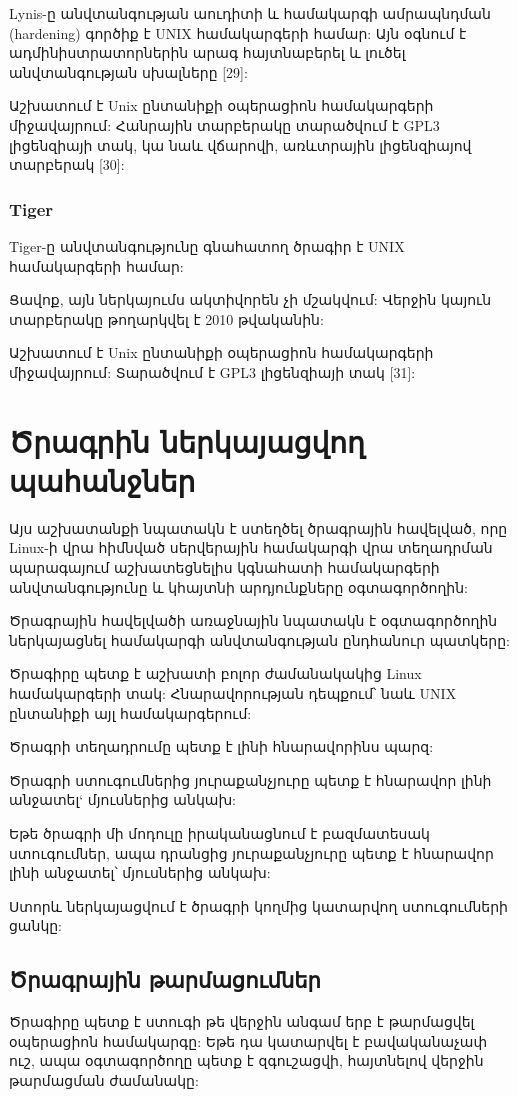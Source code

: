 \documentclass[a4paper,12pt]{article}
\begin{document}
\begin{sloppypar}
Lynis-ը անվտանգության աուդիտի և համակարգի ամրապնդման (hardening)
գործիք է UNIX համակարգերի համար:
Այն օգնում է ադմինիստրատորներին արագ հայտնաբերել և լուծել
անվտանգության սխալները [29]:

Աշխատում է Unix ընտանիքի օպերացիոն համակարգերի միջավայրում:
Հանրային տարբերակը տարածվում է GPL3 լիցենզիայի տակ, կա նաև վճարովի,
առևտրային լիցենզիայով տարբերակ [30]:


\subsubsection{Tiger}


Tiger-ը անվտանգությունը գնահատող ծրագիր է UNIX համակարգերի համար:

Ցավոք, այն ներկայումս ակտիվորեն չի մշակվում: Վերջին կայուն տարբերակը
թողարկվել է 2010 թվականին:

Աշխատում է Unix ընտանիքի օպերացիոն համակարգերի միջավայրում:
Տարածվում է GPL3 լիցենզիայի տակ [31]:


\section{Ծրագրին ներկայացվող պահանջներ}


Այս աշխատանքի նպատակն է ստեղծել ծրագրային հավելված, որը Linux-ի
վրա հիմնված սերվերային համակարգի վրա տեղադրման պարագայում
աշխատեցնելիս կգնահատի համակարգերի անվտանգությունը և կհայտնի
արդյունքները օգտագործողին:

Ծրագրային հավելվածի առաջնային նպատակն է օգտագործողին ներկայացնել
համակարգի անվտանգության ընդհանուր պատկերը:

Ծրագիրը պետք է աշխատի բոլոր ժամանակակից Linux համակարգերի տակ:
Հնարավորության դեպքում՝ նաև UNIX ընտանիքի այլ համակարգերում:

Ծրագրի տեղադրումը պետք է լինի հնարավորինս պարզ:

Ծրագրի ստուգումներից յուրաքանչյուրը պետք է հնարավոր լինի անջատել`
մյուսներից անկախ:

Եթե ծրագրի մի մոդուլը իրականացնում է բազմատեսակ ստուգումներ,
ապա դրանցից յուրաքանչյուրը պետք է հնարավոր լինի անջատել՝
մյուսներից անկախ:

Ստորև ներկայացվում է ծրագրի կողմից կատարվող ստուգումների ցանկը:


\subsection{Ծրագրային թարմացումներ}

Ծրագիրը պետք է ստուգի թե վերջին անգամ երբ է թարմացվել
օպերացիոն համակարգը:
Եթե դա կատարվել է բավականաչափ ուշ, ապա օգտագործողը պետք է
զգուշացվի, հայտնելով վերջին թարմացման ժամանակը:


\end{sloppypar}
\end{document}
